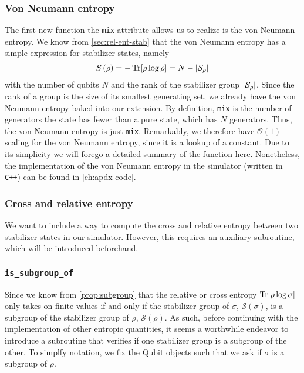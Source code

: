 \subsubsection{Von Neumann entropy}
The first new function the \verb|mix| attribute allows us to realize is the von
Neumann entropy. We know from \cref{sec:rel-ent-stab} that the von Neumann
entropy has a simple expression for stabilizer states, namely
\begin{align}
  S\left( \rho \right) = -\Tr[\rho\log\rho] = N - \abs{\mathcal{S}_\rho}
\end{align}
with the number of qubits $N$ and the rank of the stabilizer group
$\abs{\mathcal{S}_\rho}$. Since the rank of a group is the size of its smallest
generating set, we already have the von Neumann entropy baked into our
extension. By definition, \verb|mix| is the number of generators the state has
fewer than a pure state, which has $N$ generators. Thus, the von Neumann
entropy is just \verb|mix|. Remarkably, we therefore have $\mathcal{O}(1)$
scaling for the von Neumann entropy, since it is a lookup of a constant.
Due to its simplicity we will forego a detailed
summary of the function here. Nonetheless, the implementation of the von
Neumann entropy in the simulator (written in \verb|C++|) can be found in
\cref{ch:apdx-code}. 

\subsubsection{Cross and relative entropy}
We want to include a way to compute the cross and relative entropy between two
stabilizer states in our simulator. However, this requires an auxiliary
subroutine, which will be introduced beforehand.

\subsubsection{\texttt{is\_subgroup\_of}}
Since we know from \cref{prop:subgroup} that the relative or cross
entropy $\Tr[\rho\log\sigma]$ only takes on finite values if and only if the
stabilizer group of $\sigma$, $\mathcal{S}(\sigma)$, is a subgroup of the stabilizer group
of $\rho$, $\mathcal{S}(\rho)$. As such, before continuing with the implementation of
other entropic quantities, it seems a worthwhile endeavor to introduce a
subroutine that verifies if one stabilizer group is a subgroup of the other.
To simplfy notation, we fix the Qubit objects such that we ask if $\sigma$ is a
subgroup of $\rho$.

